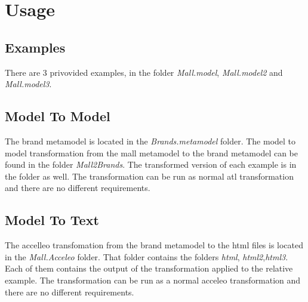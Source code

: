 \documentclass[a4paper]{article}
\begin{document}
\section{Usage}
\subsection{Examples}
There are 3 privovided examples, in the folder \textit{Mall.model}, \textit{Mall.model2} and \textit{Mall.model3}.

\subsection{Model To Model}
The brand metamodel is located in the \textit{Brands.metamodel} folder.
The model to model transformation from the mall metamodel to the brand metamodel can be found in the folder \textit{Mall2Brands}.  The transformed version of each example is in the folder as well. 
The transformation can be run as normal atl transformation and there are no different requirements. 

\subsection{Model To Text}
The accelleo transfomation from the brand metamodel to the html files is located in the \textit{Mall.Acceleo} folder. That folder contains the folders \textit{html}, \textit{html2},\textit{html3}. Each of them contains the output of the transformation applied to the relative example.
The transformation can be run as a normal acceleo transformation and there are no different requirements.
	
\end{document}

